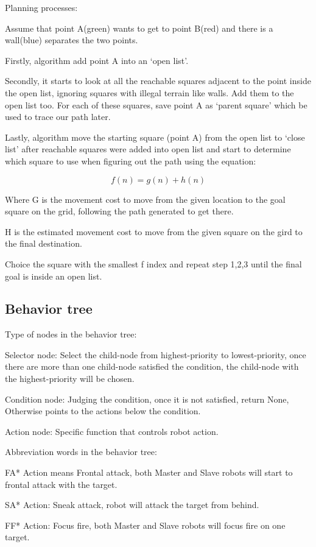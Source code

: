 Planning processes:

Assume that point A(green) wants to get to point B(red) and there is a wall(blue) separates the two points. 

Firstly, algorithm add point A into an ‘open list'.

Secondly, it starts to look at all the reachable squares adjacent to the point inside the open list, ignoring squares with illegal terrain like walls. Add them to the open list too. For each of these squares, save point A as ‘parent square' which be used to trace our path later.

Lastly, algorithm move the starting square (point A) from the open list to ‘close list' after reachable squares were added into open list and start to determine which square to use when figuring out the path using the equation:

$$f(n)=g(n)+h(n)$$

Where G is the movement cost to move from the given location to the goal square on the grid, following the path generated to get there.

H is the estimated movement cost to move from the given square on the gird to the final destination.

Choice the square with the smallest f index and repeat step 1,2,3 until the final goal is inside an open list.


\subsection{Behavior tree}

Type of nodes in the behavior tree:

Selector node: Select the child-node from highest-priority to lowest-priority, once there are more than one child-node satisfied the condition, the child-node with the highest-priority will be chosen.  

Condition node: Judging the condition, once it is not satisfied, return None, Otherwise points to the actions below the condition.

Action node: Specific function that controls robot action.

Abbreviation words in the behavior tree:

FA* Action means Frontal attack, both Master and Slave robots will start to frontal attack with the target.

SA* Action: Sneak attack, robot will attack the target from behind. 

FF* Action: Focus fire, both Master and Slave robots will focus fire on one target.

